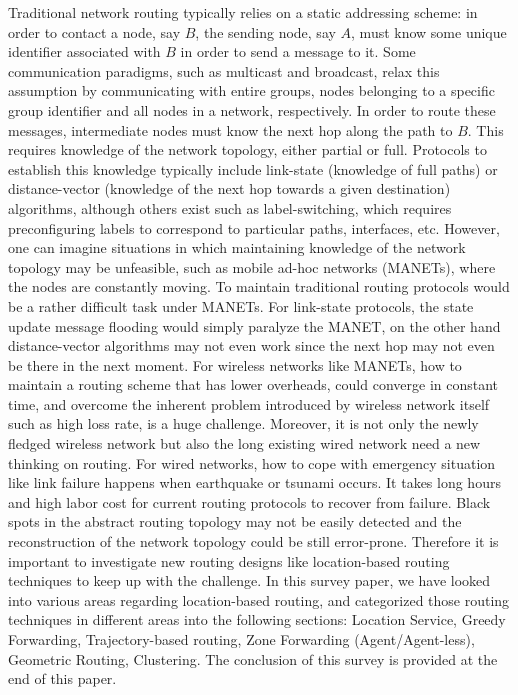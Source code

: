 \documentclass[conference]{IEEEtran}
\begin{document}
Traditional network routing typically relies on a static addressing scheme: in order to contact a node, say $B$, the sending node, say $A$, must know some unique identifier associated with $B$ in order to send a message to it.
Some communication paradigms, such as multicast and broadcast, relax this assumption by communicating with entire groups, nodes belonging to a specific group identifier and all nodes in a network, respectively.
In order to route these messages, intermediate nodes must know the next hop along the path to $B$.
This requires knowledge of the network topology, either partial or full.
Protocols to establish this knowledge typically include link-state (knowledge of full paths) or distance-vector (knowledge of the next hop towards a given destination) algorithms, although others exist such as label-switching, which requires preconfiguring labels to correspond to particular paths, interfaces, etc.
%
However, one can imagine situations in which maintaining knowledge of the network topology may be unfeasible, such as mobile ad-hoc networks (MANETs), where the nodes are constantly moving. To maintain traditional routing protocols would be a rather difficult task under MANETs. For link-state protocols, the state update message flooding would simply paralyze the MANET, on the other hand distance-vector algorithms may not even work since the next hop may not even be there in the next moment. For wireless networks like MANETs, how to maintain a routing scheme that has lower overheads, could converge in constant time, and overcome the inherent problem introduced by wireless network itself such as high loss rate, is a huge challenge.
%
Moreover, it is not only the newly fledged wireless network but also the long existing wired network need a new thinking on routing. For wired networks, how to cope with emergency situation like link failure happens when earthquake or tsunami occurs. It takes long hours and high labor cost for current routing protocols to recover from failure. Black spots in the abstract routing topology may not be easily detected and the reconstruction of the network topology could be still error-prone.
%
Therefore it is important to investigate new routing designs like location-based routing techniques to keep up with the challenge. In this survey paper, we have looked into various areas regarding location-based routing, and categorized those routing techniques in different areas into the following sections: Location Service,  Greedy Forwarding, Trajectory-based routing, Zone Forwarding (Agent/Agent-less),   Geometric Routing, Clustering. The conclusion of this survey is provided at the end of this paper.
\end{document}
